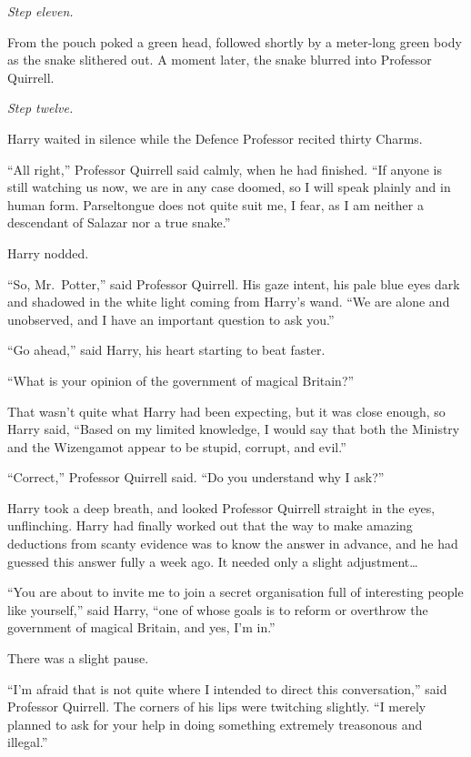 \emph{Step eleven.}

From the pouch poked a green head, followed shortly by a meter-long
green body as the snake slithered out. A moment later, the snake blurred
into Professor Quirrell.

\emph{Step twelve.}

Harry waited in silence while the Defence Professor recited thirty
Charms.

``All right,'' Professor Quirrell said calmly, when he had finished.
``If anyone is still watching us now, we are in any case doomed, so I
will speak plainly and in human form. Parseltongue does not quite suit
me, I fear, as I am neither a descendant of Salazar nor a true snake.''

Harry nodded.

``So, Mr.~Potter,'' said Professor Quirrell. His gaze intent, his pale
blue eyes dark and shadowed in the white light coming from Harry's wand.
``We are alone and unobserved, and I have an important question to ask
you.''

``Go ahead,'' said Harry, his heart starting to beat faster.

``What is your opinion of the government of magical Britain?''

That wasn't quite what Harry had been expecting, but it was close
enough, so Harry said, ``Based on my limited knowledge, I would say that
both the Ministry and the Wizengamot appear to be stupid, corrupt, and
evil.''

``Correct,'' Professor Quirrell said. ``Do you understand why I ask?''

Harry took a deep breath, and looked Professor Quirrell straight in the
eyes, unflinching. Harry had finally worked out that the way to make
amazing deductions from scanty evidence was to know the answer in
advance, and he had guessed this answer fully a week ago. It needed only
a slight adjustment\ldots{}

``You are about to invite me to join a secret organisation full of
interesting people like yourself,'' said Harry, ``one of whose goals is
to reform or overthrow the government of magical Britain, and yes, I'm
in.''

There was a slight pause.

``I'm afraid that is not quite where I intended to direct this
conversation,'' said Professor Quirrell. The corners of his lips were
twitching slightly. ``I merely planned to ask for your help in doing
something extremely treasonous and illegal.''

